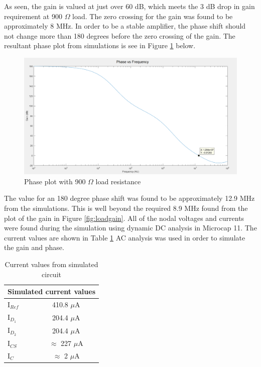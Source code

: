 As seen, the gain is valued at just over 60 dB, which meets the 3 dB drop in gain requirement at 900 $\Omega$ load. The zero crossing for the gain was found to be approximately 8 MHz. In order to be a stable amplifier, the phase shift should not change more than 180 degrees before the zero crossing of the gain. The resultant phase plot from simulations is see in Figure \ref{fig:phasesim} below.


\begin{figure}[H]
	\centering
	\includegraphics[width=0.7\linewidth]{CircuitDevelopment/phasefreqsim.png}
	\caption{Phase plot with 900 $\Omega$ load resistance}
	\label{fig:phasesim}
\end{figure}

The value for an 180 degree phase shift was found to be approximately 12.9 MHz from the simulations. This is well beyond the required 8.9 MHz found from the plot of the gain in Figure \ref{fig:loadgain}. All of the nodal voltages and currents were found during the simulation using dynamic DC analysis in Microcap 11. The current values are shown in Table \ref{tab:simcircuitcurrent} AC analysis was used in order to simulate the gain and phase. 


\begin{table}[H]
	\centering
	\caption{Current values from simulated circuit}
	\label{tab:simcircuitcurrent}
	\begin{tabular}{|l|c|}
		\hline
		\multicolumn{2}{|l|}{Simulated current values}                            \\ \hline
		I$_{Ref}$ & 410.8 $\mu$A                                                  \\ \hline
		I$_{D_1}$ & 204.4 $\mu$A                                                  \\ \hline
		I$_{D_2}$ & 204.4 $\mu$A                                                  \\ \hline
		I$_{CS}$  & $\approx$  227 $\mu$A                                         \\ \hline
		I$_{C}$   & $\approx$ 2  $\mu$A										 \\	\hline

	\end{tabular}
\end{table}

